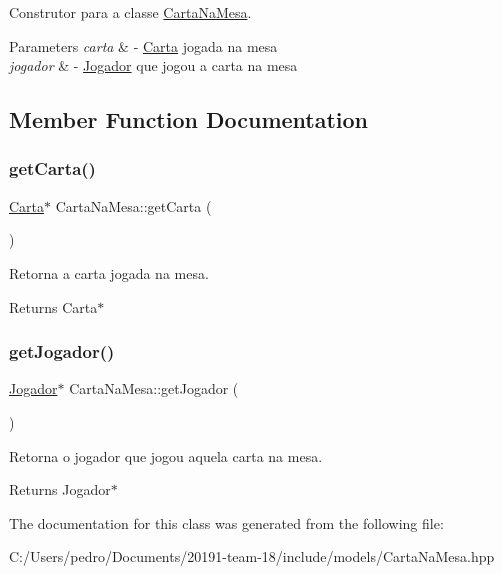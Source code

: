 Construtor para a classe \mbox{\hyperlink{class_carta_na_mesa}{Carta\+Na\+Mesa}}. 


\begin{DoxyParams}{Parameters}
{\em carta} & -\/ \mbox{\hyperlink{class_carta}{Carta}} jogada na mesa \\
\hline
{\em jogador} & -\/ \mbox{\hyperlink{class_jogador}{Jogador}} que jogou a carta na mesa \\
\hline
\end{DoxyParams}


\subsection{Member Function Documentation}
\mbox{\label{class_carta_na_mesa_a2019e0269144f552f218ae795b7ab599}} 
\subsubsection{\texorpdfstring{getCarta()}{getCarta()}}
{\footnotesize\ttfamily \mbox{\hyperlink{class_carta}{Carta}}$\ast$ Carta\+Na\+Mesa\+::get\+Carta (\begin{DoxyParamCaption}{ }\end{DoxyParamCaption})}



Retorna a carta jogada na mesa. 

\begin{DoxyReturn}{Returns}
Carta$\ast$ 
\end{DoxyReturn}
\mbox{\label{class_carta_na_mesa_a2dd1806034ff0ca5cb9c02a28bee709f}} 
\subsubsection{\texorpdfstring{getJogador()}{getJogador()}}
{\footnotesize\ttfamily \mbox{\hyperlink{class_jogador}{Jogador}}$\ast$ Carta\+Na\+Mesa\+::get\+Jogador (\begin{DoxyParamCaption}{ }\end{DoxyParamCaption})}



Retorna o jogador que jogou aquela carta na mesa. 

\begin{DoxyReturn}{Returns}
Jogador$\ast$ 
\end{DoxyReturn}


The documentation for this class was generated from the following file\+:\begin{DoxyCompactItemize}
\item 
C\+:/\+Users/pedro/\+Documents/20191-\/team-\/18/include/models/Carta\+Na\+Mesa.\+hpp\end{DoxyCompactItemize}
